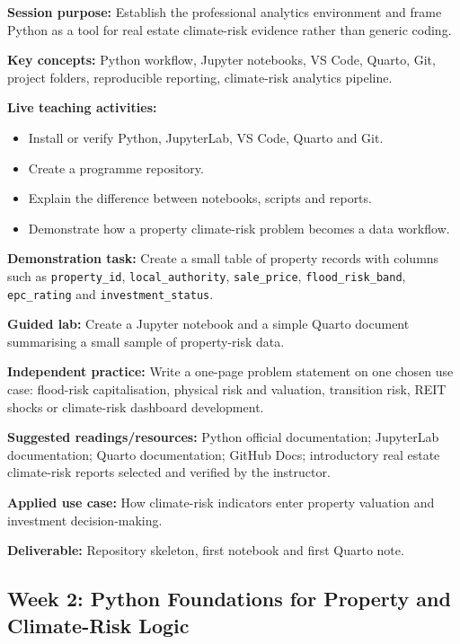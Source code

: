 \documentclass[
  a4paper,
]{article}
\providecommand{\tightlist}{%
  \setlength{\itemsep}{0pt}\setlength{\parskip}{0pt}}
\begin{document}
\textbf{Session purpose:} Establish the professional analytics
environment and frame Python as a tool for real estate climate-risk
evidence rather than generic coding.

\textbf{Key concepts:} Python workflow, Jupyter notebooks, VS Code,
Quarto, Git, project folders, reproducible reporting, climate-risk
analytics pipeline.

\textbf{Live teaching activities:}

\begin{itemize}
\tightlist
\item
  Install or verify Python, JupyterLab, VS Code, Quarto and Git.
\item
  Create a programme repository.
\item
  Explain the difference between notebooks, scripts and reports.
\item
  Demonstrate how a property climate-risk problem becomes a data
  workflow.
\end{itemize}

\textbf{Demonstration task:} Create a small table of property records
with columns such as \texttt{property\_id}, \texttt{local\_authority},
\texttt{sale\_price}, \texttt{flood\_risk\_band}, \texttt{epc\_rating}
and \texttt{investment\_status}.

\textbf{Guided lab:} Create a Jupyter notebook and a simple Quarto
document summarising a small sample of property-risk data.

\textbf{Independent practice:} Write a one-page problem statement on one
chosen use case: flood-risk capitalisation, physical risk and valuation,
transition risk, REIT shocks or climate-risk dashboard development.

\textbf{Suggested readings/resources:} Python official documentation;
JupyterLab documentation; Quarto documentation; GitHub Docs;
introductory real estate climate-risk reports selected and verified by
the instructor.

\textbf{Applied use case:} How climate-risk indicators enter property
valuation and investment decision-making.

\textbf{Deliverable:} Repository skeleton, first notebook and first
Quarto note.

\subsection{Week 2: Python Foundations for Property and Climate-Risk
Logic}\label{week-2-python-foundations-for-property-and-climate-risk-logic}
\end{document}
